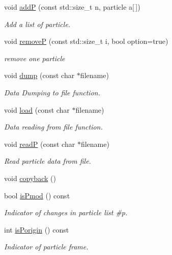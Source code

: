 \begin{DoxyCompactItemize}
void \hyperlink{classARC_1_1chain_a658a7b777ac45e7900990dcc6ef0b752}{addP} (const std\+::size\+\_\+t n, particle a\mbox{[}$\,$\mbox{]})
\begin{DoxyCompactList}\small\item\em Add a list of particle. \end{DoxyCompactList}\item 
void \hyperlink{classARC_1_1chain_a6c622f6f09a11f81a72e26de0c8cbfc8}{removeP} (const std\+::size\+\_\+t i, bool option=true)
\begin{DoxyCompactList}\small\item\em remove one particle \end{DoxyCompactList}\item 
void \hyperlink{classARC_1_1chain_adefda13efa8a0a22e4597600ea1bc193}{dump} (const char $\ast$filename)
\begin{DoxyCompactList}\small\item\em Data Dumping to file function. \end{DoxyCompactList}\item 
void \hyperlink{classARC_1_1chain_aed5f04b05a5875cd9a8b45da8fdfa28c}{load} (const char $\ast$filename)
\begin{DoxyCompactList}\small\item\em Data reading from file function. \end{DoxyCompactList}\item 
void \hyperlink{classARC_1_1chain_ad2e17ce21d086e8852951cf31568cf76}{readP} (const char $\ast$filename)
\begin{DoxyCompactList}\small\item\em Read particle data from file. \end{DoxyCompactList}\item 
void \hyperlink{classARC_1_1chain_a780fe41b768a5f8821ea799dae8b3d10}{copyback} ()
\item 
bool \hyperlink{classARC_1_1chain_a9ed7067050141069bc98dccf8f7ab9d0}{is\+Pmod} () const
\begin{DoxyCompactList}\small\item\em Indicator of changes in particle list \#p. \end{DoxyCompactList}\item 
int \hyperlink{classARC_1_1chain_afd0342ec9b20a318d811f3ec0f6c9950}{is\+Porigin} () const
\begin{DoxyCompactList}\small\item\em Indicator of particle frame. \end{DoxyCompactList}\item 

\end{DoxyCompactItemize}
